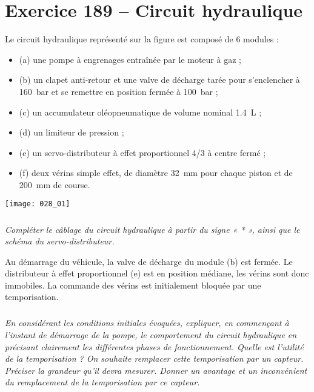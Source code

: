 \section*{Exercice 189 -- Circuit hydraulique}
\setcounter{exo}{0}


Le circuit hydraulique représenté sur la figure est composé de 6 modules :
\begin{itemize}
\item (a)	une pompe à engrenages entraînée par le moteur à gaz ;
\item (b)	un clapet anti-retour et une valve de décharge tarée pour s'enclencher à \SI{160}{bar} et se remettre en position fermée à \SI{100}{bar} ;
\item (c)	un accumulateur oléopneumatique de volume nominal \SI{1,4}{L} ;
\item (d)	un limiteur de pression ;
\item (e)	un servo-distributeur à effet proportionnel 4/3 à centre fermé ;
\item (f)	deux vérins simple effet, de diamètre \SI{32}{mm} pour chaque piston et de \SI{200}{mm} de course.
\end{itemize}

\begin{center}
\texttt{[image: 028\_01]}
\end{center}
\subparagraph{}\textit{Compléter le câblage du circuit hydraulique à partir du signe « * », ainsi que le schéma du servo-distributeur.}
\ifprof
\begin{corrige}
\end{corrige}
\else
\fi

Au démarrage du véhicule, la valve de décharge du module (b) est fermée. Le distributeur à effet proportionnel (e) est en position médiane, les vérins sont donc immobiles. La commande des vérins est initialement bloquée par une temporisation.

\subparagraph{}\textit{En considérant les conditions initiales évoquées, expliquer, en commençant à l'instant de démarrage de la pompe, le comportement du circuit hydraulique en précisant clairement les différentes phases de fonctionnement. Quelle est l'utilité de la temporisation ? On souhaite remplacer cette temporisation par un capteur. Préciser la grandeur qu'il devra mesurer. Donner un avantage et un inconvénient du remplacement de la temporisation par ce capteur.}
\ifprof
\begin{corrige}
\end{corrige}
\else
\fi
